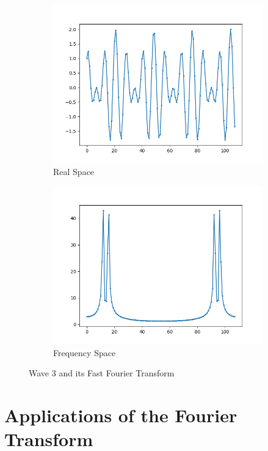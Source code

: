 \documentclass{amsproc}
\begin{document}
\begin{figure}[h]
\centering
\begin{subfigure}{.4\textwidth}
	\centering
	\includegraphics[scale=.3]{FFTOriginal3.png}
	\caption{Real Space}
	\label{fig:sub3}
\end{subfigure} %
\begin{subfigure}{.4\textwidth}
	\centering
	\includegraphics[scale=.3]{FFTResult3.png}
	\caption{Frequency Space}
	\label{fig:sub4}
\end{subfigure}
\caption{Wave 3 and its Fast Fourier Transform}
\label{fig:text3}
\end{figure}
\section{Applications of the Fourier Transform}
\end{document}
